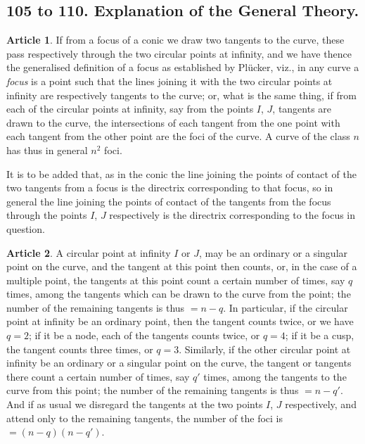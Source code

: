 \documentclass[11pt,a4paper]{article}
\theoremstyle{definition}
\newtheorem{art}{Article}
\begin{document}
\subsection{105 to 110. Explanation of the General Theory.}

\begin{art}
If from a focus of a conic we draw two tangents to the curve, these pass respectively through the two circular points at infinity, and we have thence the generalised definition of a focus as established by Pl\"ucker, viz., in any curve a \textit{focus} is a point such that the lines joining it with the two circular points at infinity are respectively tangents to the curve; or, what is the same thing, if from each of the circular points at infinity, say from the points $I$, $J$, tangents are drawn to the curve, the intersections of each tangent from the one point with each tangent from the other point are the foci of the curve. A curve of the class $n$ has thus in general $n^{2}$ foci.

It is to be added that, as in the conic the line joining the points of contact of the two tangents from a focus is the directrix corresponding to that focus, so in general the line joining the points of contact of the tangents from the focus through the points $I$, $J$ respectively is the directrix corresponding to the focus in question.
\end{art}

\begin{art}
A circular point at infinity $I$ or $J$, may be an ordinary or a singular point on the curve, and the tangent at this point then counts, or, in the case of a multiple point, the tangents at this point count a certain number of times, say $q$ times, among the tangents which can be drawn to the curve from the point; the number of the remaining tangents is thus $= n - q$. In particular, if the circular point at infinity be an ordinary point, then the tangent counts twice, or we have $q = 2$; if it be a node, each of the tangents counts twice, or $q = 4$; if it be a cusp, the tangent counts three times, or $q = 3$. Similarly, if the other circular point at infinity be an ordinary or a singular point on the curve, the tangent or tangents there count a certain number of times, say $q'$ times, among the tangents to the curve from this point; the number of the remaining tangents is thus $= n - q'$. And if as usual we disregard the tangents at the two points $I$, $J$ respectively, and attend only to the remaining tangents, the number of the foci is $= (n - q)(n - q')$.
\end{art}
\end{document}
